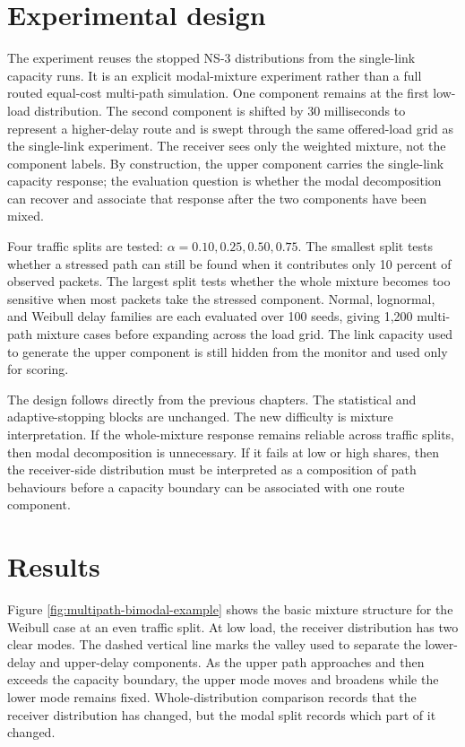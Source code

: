 \documentclass[a4paper,11pt]{report}
\begin{document}
\section{Experimental design}

The experiment reuses the stopped NS-3 distributions from the single-link capacity runs. It is an explicit modal-mixture experiment rather than a full routed equal-cost multi-path simulation. One component remains at the first low-load distribution. The second component is shifted by 30 milliseconds to represent a higher-delay route and is swept through the same offered-load grid as the single-link experiment. The receiver sees only the weighted mixture, not the component labels. By construction, the upper component carries the single-link capacity response; the evaluation question is whether the modal decomposition can recover and associate that response after the two components have been mixed.

Four traffic splits are tested: \(\alpha=0.10,0.25,0.50,0.75\). The smallest split tests whether a stressed path can still be found when it contributes only 10 percent of observed packets. The largest split tests whether the whole mixture becomes too sensitive when most packets take the stressed component. Normal, lognormal, and Weibull delay families are each evaluated over 100 seeds, giving 1,200 multi-path mixture cases before expanding across the load grid. The link capacity used to generate the upper component is still hidden from the monitor and used only for scoring.

The design follows directly from the previous chapters. The statistical and adaptive-stopping blocks are unchanged. The new difficulty is mixture interpretation. If the whole-mixture response remains reliable across traffic splits, then modal decomposition is unnecessary. If it fails at low or high shares, then the receiver-side distribution must be interpreted as a composition of path behaviours before a capacity boundary can be associated with one route component.

\section{Results}

Figure \ref{fig:multipath-bimodal-example} shows the basic mixture structure for the Weibull case at an even traffic split. At low load, the receiver distribution has two clear modes. The dashed vertical line marks the valley used to separate the lower-delay and upper-delay components. As the upper path approaches and then exceeds the capacity boundary, the upper mode moves and broadens while the lower mode remains fixed. Whole-distribution comparison records that the receiver distribution has changed, but the modal split records which part of it changed.
\end{document}
